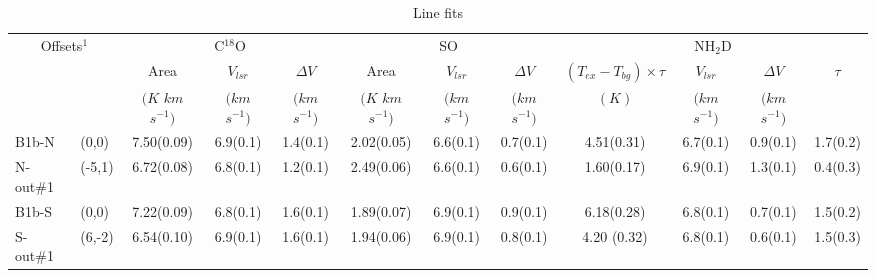 \documentclass[letter]{aa}
\begin{document}
\begin{appendix}
\begin{table*}
\caption{Line fits}
\label{TableA2}
\begin{tabular}{l|l|ccc|ccc|cccc}
\hline
\hline
\multicolumn{2}{c|}{{\small Offsets$^1$}} & \multicolumn{3}{c|}{{\small C$^{18}$O}}  & 
\multicolumn{3}{c|}{{\small SO}} &  \multicolumn{4}{c}{{\small NH$_2$D}} \\ 
\multicolumn{2}{c|}{} & \multicolumn{1}{c}{{\small Area}}  & \multicolumn{1}{c}{{\small $V_{lsr}$}} &  
\multicolumn{1}{c|}{{\small $\Delta V$}} &
\multicolumn{1}{c}{{\small Area}}  & \multicolumn{1}{c}{{\small $V_{lsr}$}} &  \multicolumn{1}{c|}{{\small $\Delta V$}} &
\multicolumn{1}{c}{{\small $(T_{ex}-T_{bg}) \times \tau$}}  & \multicolumn{1}{c}{{\small $V_{lsr}$}} &  
\multicolumn{1}{c}{{\small $\Delta V$}} & \multicolumn{1}{c}{{\small $\tau$}} \\
 \multicolumn{2}{c|}{} & \multicolumn{1}{c}{{\small $(K$ $km$ $s^{-1})$}}  & \multicolumn{1}{c}{{\small $(km$ $s^{-1})$}} &  
 \multicolumn{1}{c|}{{\small $(km$ $s^{-1})$}} &
\multicolumn{1}{c}{{\small $(K$ $km$ $s^{-1})$}}  & \multicolumn{1}{c}{{\small $(km$ $s^{-1})$}} &  
\multicolumn{1}{c|}{{\small $(km$ $s^{-1})$}} &
\multicolumn{1}{c}{{\small $(K)$}}  & \multicolumn{1}{c}{{\small $(km$ $s^{-1})$}} &  \multicolumn{1}{c}{{\small $(km$ $s^{-1})$}} &
 \multicolumn{1}{c}{} \\
 \hline
{\small B1b-N}   &  {\small (0,0)}  & {\small 7.50(0.09)} &   {\small 6.9(0.1)} &  {\small 1.4(0.1)} & {\small 2.02(0.05)} & 
{\small 6.6(0.1)} &  {\small 0.7(0.1)} &  {\small 4.51(0.31)} &  {\small 6.7(0.1)} & {\small 0.9(0.1)} &  {\small 1.7(0.2)} \\ 
%
{\small N-out\#1} & {\small (-5,1)}  & {\small 6.72(0.08)} &  {\small 6.8(0.1)} &  {\small 1.2(0.1)} & 
{\small 2.49(0.06)} & {\small 6.6(0.1)} &  {\small 0.6(0.1)} &  {\small 1.60(0.17)} &  {\small 6.9(0.1)} &  
{\small 1.3(0.1)} &  {\small 0.4(0.3)} \\ \hline
%
{\small B1b-S}   &  {\small(0,0)} &  {\small 7.22(0.09)} &  {\small 6.8(0.1)} & {\small 1.6(0.1)} & 
{\small 1.89(0.07)} & {\small 6.9(0.1)} &  {\small 0.9(0.1)} &  {\small 6.18(0.28)} &  {\small 6.8(0.1)} &  {\small 0.7(0.1)} &  
{\small 1.5(0.2)} \\
%
{\small S-out\#1} &  {\small (6,-2)}  &  {\small 6.54(0.10)} & {\small 6.9(0.1)} & {\small 1.6(0.1)} & {\small 1.94(0.06)} & 
{\small 6.9(0.1)} &  {\small 0.8(0.1)} & {\small 4.20 (0.32)}  & {\small 6.8(0.1)} & {\small 0.6(0.1)}  & {\small 1.5(0.3)} \\

\end{tabular}
\end{table*}
\end{appendix}
\end{document}
